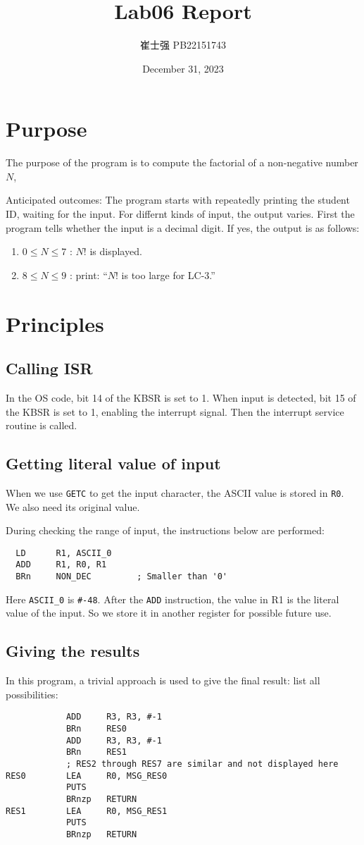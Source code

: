 \documentclass[UTF8]{ctexart}
\title{Lab06 Report}
\author{崔士强 PB22151743}
\date{December 31, 2023}
\begin{document}
\maketitle
\section{Purpose}
The purpose of the program is to compute the factorial of a non-negative number $N$, 

Anticipated outcomes: The program starts with repeatedly printing the student ID, waiting for the input.
For differnt kinds of input, the output varies. 
First the program tells whether the input is a decimal digit. If yes, the output is as follows:
\begin{enumerate}
  \item $0 \leq N \leq 7$ : $N!$ is displayed.
  \item $8 \leq N \leq 9$ : print: “$N!$ is too large for LC-3.”
\end{enumerate}

\section{Principles}
\subsection{Calling ISR}
In the OS code, bit 14 of the KBSR is set to 1. When input is detected, bit 15 of the KBSR is set to 1,
enabling the interrupt signal. Then the interrupt service routine is called.
\subsection{Getting literal value of input}
When we use \lstinline{GETC} to get the input character, the ASCII value is stored in \lstinline{R0}.
We also need its original value.

During checking the range of input, the instructions below are performed:
\begin{lstlisting}
  LD      R1, ASCII_0
  ADD     R1, R0, R1
  BRn     NON_DEC         ; Smaller than '0'
\end{lstlisting}
Here \lstinline{ASCII_0} is \lstinline{#-48}. After the \lstinline{ADD} instruction, 
the value in R1 is the literal value of the input. So we store it in another register for possible future use.
\subsection{Giving the results}
In this program, a trivial approach is used to give the final result: list all possibilities:
\begin{lstlisting}
            ADD     R3, R3, #-1
            BRn     RES0
            ADD     R3, R3, #-1
            BRn     RES1
            ; RES2 through RES7 are similar and not displayed here
RES0        LEA     R0, MSG_RES0
            PUTS
            BRnzp   RETURN
RES1        LEA     R0, MSG_RES1
            PUTS
            BRnzp   RETURN
\end{lstlisting}
\end{document}
